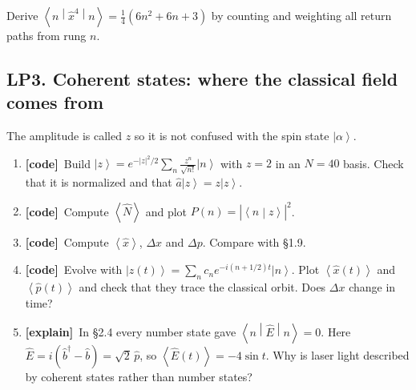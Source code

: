 \documentclass[11pt]{article}
\newif\ifsolutions
\newcommand{\tagbox}[2]{\textcolor{#1}{\textsf{\textbf{[#2]}}}}
\newcommand{\code}{\tagbox{codec}{code}}
\newcommand{\expl}{\tagbox{explc}{explain}}
\newcommand{\ans}[1]{\ifsolutions\par\noindent\hspace*{1.5em}\textcolor{ansc}{\small\textit{Answer:} #1}\fi}
\newcommand{\ket}[1]{\left|#1\right\rangle}
\newcommand{\braket}[2]{\left\langle#1\middle|#2\right\rangle}
\newcommand{\mel}[3]{\left\langle#1\middle|#2\middle|#3\right\rangle}
\newcommand{\expval}[1]{\left\langle#1\right\rangle}
\newcommand{\aop}{\hat{a}}
\newcommand{\Nop}{\hat{N}}
\newcommand{\xop}{\hat{x}}
\newcommand{\pop}{\hat{p}}
\begin{document}
\begin{gradext}
Derive $\mel{n}{\xop^4}{n} = \tfrac14(6n^2 + 6n + 3)$ by counting and weighting all return paths from rung $n$.
\end{gradext}

\subsection*{LP3. Coherent states: where the classical field comes from}

The amplitude is called $z$ so it is not confused with the spin state $\ket\alpha$.

\begin{enumerate}
\item \code\ Build
$\displaystyle \ket z = e^{-|z|^2/2}\sum_{n} \frac{z^n}{\sqrt{n!}}\ket n$
with $z = 2$ in an $N = 40$ basis. Check that it is normalized and that $\aop\ket z = z\ket z$.
\ans{A coherent state is an eigenstate of the lowering operator (residual $\sim10^{-12}$).}

\item \code\ Compute $\expval{\Nop}$ and plot $P(n) = |\braket{n}{z}|^2$.
\ans{$\expval{\Nop} = |z|^2 = 4$; $P(n)$ is a Poisson distribution peaked at $n = 3$--$4$.}

\item \code\ Compute $\expval{\xop}$, $\Delta x$ and $\Delta p$. Compare with \S1.9.
\ans{$\expval{\xop} = 2\sqrt2 \approx 2.83$; $\Delta x = \Delta p = 1/\sqrt2$, so $\Delta x\Delta p = \tfrac12$: like the ground state, a minimum-uncertainty state.}

\item \code\ Evolve with $\ket{z(t)} = \sum_n c_n e^{-i(n+1/2)t}\ket n$.
Plot $\expval{\xop(t)}$ and $\expval{\pop(t)}$ and check that they trace the classical orbit. Does $\Delta x$ change in time?
\ans{$\expval{\xop} = 2.83,\ 0,\ -2.83$ at $t = 0,\ T/4,\ T/2$; $\expval{\pop}$ lags by a quarter period. $\Delta x = 1/\sqrt2$ at all times.}

\item \expl\ In \S2.4 every number state gave $\mel{n}{\hat E}{n} = 0$.
Here $\hat E = i(\hat b^\dagger - \hat b) = \sqrt2\,\pop$, so $\expval{\hat E(t)} = -4\sin t$.
Why is laser light described by coherent states rather than number states?
\ans{A coherent state has an oscillating mean field with the smallest allowed fluctuations, which is what a classical wave looks like; a number state has a definite photon count but zero mean field.}
\end{enumerate}
\end{document}
